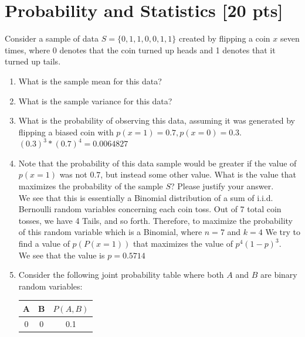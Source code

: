 \documentclass[a4paper]{article}
\theoremstyle{definition}
\newenvironment{soln}{
    \leavevmode\color{blue}\ignorespaces
}{}
\begin{document}
\section{Probability and Statistics [20 pts]}
Consider a sample of data $S = \{0, 1, 1, 0, 0, 1, 1\}$ created by flipping a coin $x$ seven times, where 0 denotes that the coin turned up heads and 1 denotes that it turned up tails.
\begin{enumerate}
	\item 	What is the sample mean for this data?\\
	    \begin{soln}  0.5714 \end{soln}
	\item 	What is the sample variance for this data?\\
	    \begin{soln}  0.24489 \end{soln}
	\item 	What is the probability of observing this data, assuming it was generated by flipping a biased coin with $p(x=1) = 0.7, p(x=0) = 0.3$.\\
	    \begin{soln}  $(0.3)^3 * (0.7)^4 = 0.0064827$ \end{soln}
	\item 	Note that the probability of this data sample would be greater if the value of $p(x = 1)$ was not $0.7$, but instead some other value. What is the value that maximizes the probability of the sample $S$? Please justify your answer.\\
	    \begin{soln}  We see that this is essentially a Binomial distribution of a sum of i.i.d. Bernoulli random variables concerning each coin toss. Out of 7 total coin tosses, we have 4 Tails, and so forth. Therefore, to maximize the probability of this random variable which is a Binomial, where $n=7$ and $k=4$ We try to find a value of $p(P(x=1))$ that maximizes the value of $p^{4} (1-p)^{3}.$\\ 	We see that the value is $p=0.5714$ \end{soln}
	\item 	Consider the following joint probability table where both $A$ and $B$ are binary random variables: 
\begin{table}[htb]
\centering
	\begin{tabular}{ccc}\hline
	A & B & $P(A, B)$  \\\hline
	0 & 0 & 0.1 \\

\end{tabular}
\end{table}
\end{enumerate}
\end{document}
